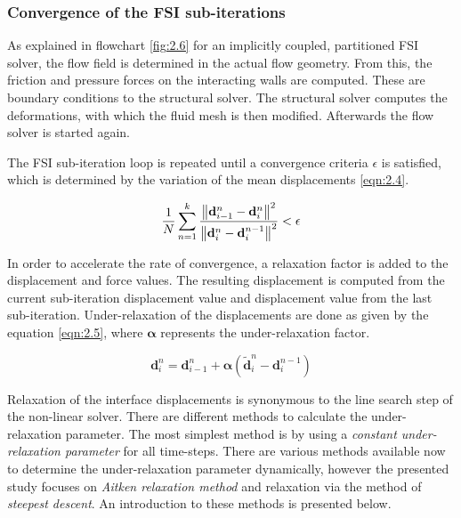 \subsubsection*{Convergence of the FSI sub-iterations}
As explained in flowchart \ref{fig:2.6} for an implicitly coupled, partitioned FSI solver, the flow field is determined in the actual flow geometry. From this, the friction and pressure forces on the
interacting walls are computed. These are boundary conditions to the structural solver. The structural solver computes the deformations, with which the fluid mesh is then modified. Afterwards the flow solver is started again. 

The FSI sub-iteration loop is repeated until a convergence criteria $\epsilon$ is satisfied, which is determined by the variation of the mean displacements \ref{eqn:2.4}.

\begin{equation}\label{eqn:2.4}
\frac{1}{N}\sum_{n=1}^{k}\frac{\norm{\mathbf{d}_{i-1}^{n}-\mathbf{d}_{i}^{n}}^2}{\norm{\mathbf{d}_{i}^{n}-\mathbf{d}_{i}^{n-1}}^2}<\epsilon
\end{equation}

In order to accelerate the rate of convergence, a relaxation factor is added to the displacement and force values. The resulting displacement is computed from the current sub-iteration displacement value and displacement value from the last sub-iteration. Under-relaxation of the displacements are done as given by the equation \ref{eqn:2.5}, where $\mathbf{\alpha}$ represents the under-relaxation factor.

\begin{equation}\label{eqn:2.5}
\mathbf{d}_{i}^{n}=\mathbf{d}_{i-1}^{n}+\mathbf{\alpha}\left(\tilde{\mathbf{d}}_{i}^{n}-\mathbf{d}_{i}^{n-1}\right)
\end{equation} 

Relaxation of the interface displacements is synonymous to the line search step of the non-linear solver. There are different methods to calculate the under-relaxation parameter. The most simplest method is by using a \textit{constant under-relaxation parameter} for all time-steps. There are various methods available now to determine the under-relaxation parameter dynamically, however the presented study focuses on \textit{Aitken relaxation method} and relaxation via the method of \textit{steepest descent}. An introduction to these methods is presented below.

